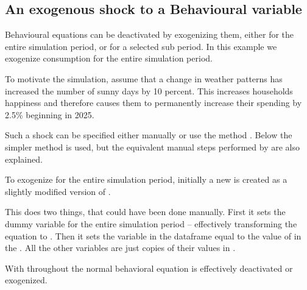 \documentclass[letterpaper,10pt,english]{jupyterBook}
\begin{document}
\subsection{An exogenous shock to a Behavioural variable}
\label{\detokenize{content/06_WBModels/ScenarioAnalysis:an-exogenous-shock-to-a-behavioural-variable}}
\sphinxAtStartPar
Behavioural equations can be de\sphinxhyphen{}activated by exogenizing them, either for the entire simulation period, or for a selected sub period.  In this example we exogenize consumption for the entire simulation period.

\sphinxAtStartPar
To motivate the simulation, assume that a change in weather patterns has increased the number of sunny days by 10 percent. This increases households happiness and therefore causes them to permanently increase their spending by 2.5\% beginning in 2025.

\sphinxAtStartPar
Such a shock can be specified either manually or use the method . Below the simpler  method is used, but the equivalent manual steps performed by  are also explained.

\sphinxAtStartPar
To exogenize  for the entire simulation period, initially a new  is created as a slightly modified version of  .

\sphinxAtStartPar
{}

\sphinxAtStartPar
This does two things, that could have been done manually.  First it sets the dummy variable  for the entire simulation period – effectively transforming the equation to .  Then it sets the variable  in the  dataframe equal to the value of  in the  . All the other variables are  just copies of their values in .

\sphinxAtStartPar
With  throughout the normal behavioral equation is effectively de\sphinxhyphen{}activated or exogenized.
\end{document}
